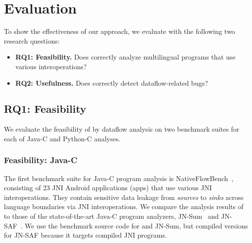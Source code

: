\newcommand{\req}[1]{RQ#1}

\section{Evaluation}\label{sec:eval}



To show the effectiveness of our approach, we evaluate
\ours with the following two research questions:
\begin{itemize}
  \item \textbf{\req{1}: Feasibility.} Does \ours correctly analyze multilingual
    programs that use various interoperations?

  \item \textbf{\req{2}: Usefulness.} Does \ours correctly detect dataflow-related
    bugs?
\end{itemize}

\subsection{\req{1}: Feasibility}
We evaluate the feasibility of \ours by dataflow analysis on
two benchmark suites for each of Java-C and Python-C analyses.

\subsubsection{Feasibility: Java-C}
The first benchmark suite for Java-C program analysis is NativeFlowBench~\cite{nativeflowbench, JN-SAF},
consisting of 23 JNI Android applications (apps) that use various JNI interoperations.
They contain sensitive data leakage from {\it sources} to {\it sinks}
across language boundaries via JNI interoperations.
We compare the analysis results of \ours to those of the state-of-the-art Java-C program
analyzers, JN-Sum~\cite{LeeASE20} and JN-SAF~\cite{JN-SAF}. We use
the benchmark source code for \ours and JN-Sum, but compiled
versions for JN-SAF because it targets compiled JNI programs.

